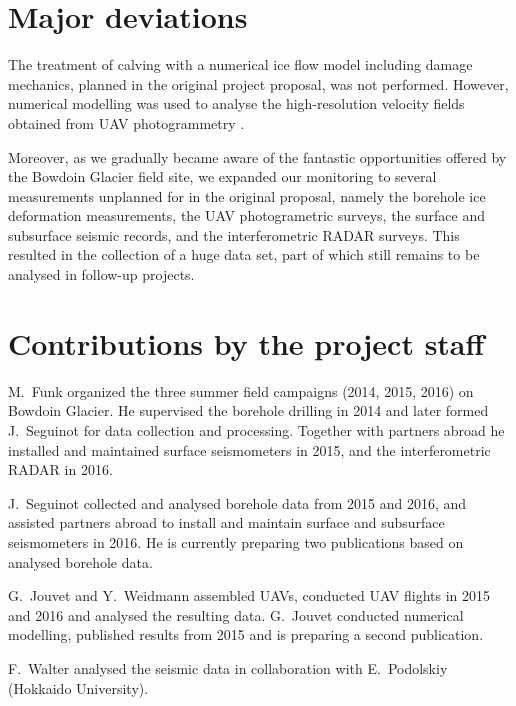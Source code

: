 \documentclass{article}
\begin{document}
\section{Major deviations}

The treatment of calving with a numerical ice flow model including damage
mechanics, planned in the original project proposal, was not performed.
However, numerical modelling was used to analyse the high-resolution velocity
fields obtained from UAV photogrammetry \citep{Jouvet.etal.2016}.

Moreover, as we gradually became aware of the fantastic opportunities offered
by the Bowdoin Glacier field site, we expanded our monitoring to several
measurements unplanned for in the original proposal, namely the borehole ice
deformation measurements, the UAV photogrametric surveys, the surface and
subsurface seismic records, and the interferometric RADAR surveys. This
resulted in the collection of a huge data set, part of which still remains to
be analysed in follow-up projects.


\section{Contributions by the project staff}

M.~Funk organized the three summer field campaigns (2014, 2015, 2016) on
Bowdoin Glacier. He supervised the borehole drilling in 2014 and later formed
J.~Seguinot for data collection and processing. Together with partners abroad
he installed and maintained surface seismometers in 2015, and the
interferometric RADAR in 2016.

J.~Seguinot collected and analysed borehole data from 2015 and 2016, and
assisted partners abroad to install and maintain surface and subsurface
seismometers in 2016. He is currently preparing two publications based on
analysed borehole data.

G.~Jouvet and Y.~Weidmann assembled UAVs, conducted UAV flights in 2015 and
2016 and analysed the resulting data. G.~Jouvet conducted numerical modelling,
published results from 2015 and is preparing a second publication.

F.~Walter analysed the seismic data in collaboration with E.~Podolskiy
(Hokkaido University).
\end{document}
